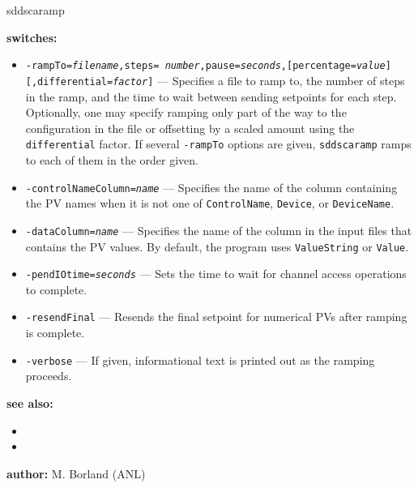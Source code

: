 \begin{sddsprog}{sddscaramp}
\item \textbf{switches:}
\begin{itemize}
  \item {\tt -rampTo={\em filename},steps={\em
        number},pause={\em seconds},[percentage={\em value}][,differential={\em factor}]} ---
        Specifies a file to ramp to, the number of steps in the ramp,
        and the time to wait between sending setpoints for each step.
        Optionally, one may specify ramping only part of the way to
        the configuration in the file or offsetting by a scaled
        amount using the {\tt differential} factor.  If several
        {\tt -rampTo} options are given, {\tt sddscaramp} ramps to each
        of them in the order given.
  \item {\tt -controlNameColumn={\em name}} --- Specifies the
        name of the column containing the PV names when it is not
        one of {\tt ControlName}, {\tt Device}, or {\tt DeviceName}.
  \item {\tt -dataColumn={\em name}} --- Specifies the name of
        the column in the input files that contains the PV values.
        By default, the program uses {\tt ValueString} or {\tt Value}.
  \item {\tt -pendIOtime={\em seconds}} --- Sets the time to
        wait for channel access operations to complete.
  \item {\tt -resendFinal} --- Resends the final setpoint for
        numerical PVs after ramping is complete.
  \item {\tt -verbose} --- If given, informational text is
        printed out as the ramping proceeds.
\end{itemize}

\item \textbf{see also:}
\begin{itemize}
  \item {}
  \item {}
\end{itemize}
\item \textbf{author:} M. Borland (ANL)
\end{sddsprog}
